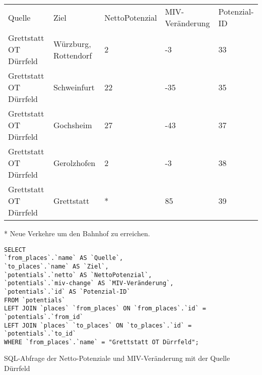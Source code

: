 \begin{tabularx}{\textwidth}{*5{X}}
Quelle & Ziel & NettoPotenzial & MIV-Veränderung & Potenzial-ID\\ 
Grettstatt OT Dürrfeld & Würzburg, Rottendorf & 2 & -3 & 33\\ 
Grettstatt OT Dürrfeld & Schweinfurt & 22 & -35 & 35\\ 
Grettstatt OT Dürrfeld & Gochsheim & 27 & -43 & 37\\ 
Grettstatt OT Dürrfeld & Gerolzhofen & 2 & -3 & 38\\ 
Grettstatt OT Dürrfeld & Grettstatt & * & 85 & 39\\ 
\end{tabularx}       
\newline
\newline
* Neue Verkehre um den Bahnhof zu erreichen.
\newline
\begin{listing}[htbp]
\begin{verbatim}
SELECT
`from_places`.`name` AS `Quelle`, 
`to_places`.`name` AS `Ziel`, 
`potentials`.`netto` AS `NettoPotenzial`, 
`potentials`.`miv-change` AS `MIV-Veränderung`, 
`potentials`.`id` AS `Potenzial-ID`
FROM `potentials`
LEFT JOIN `places` `from_places` ON `from_places`.`id` = `potentials`.`from_id`
LEFT JOIN `places` `to_places` ON `to_places`.`id` = `potentials`.`to_id`
WHERE `from_places`.`name` = "Grettstatt OT Dürrfeld";
\end{verbatim}
\caption{SQL-Abfrage der Netto-Potenziale und MIV-Veränderung mit der Quelle Dürrfeld}\label{lst-fz-duerrfeld}
\end{listing}